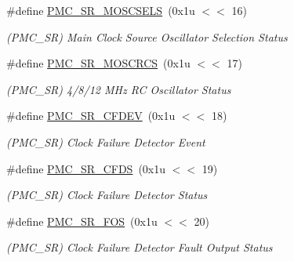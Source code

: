 \begin{DoxyCompactItemize}
\mbox{\label{group__SAMV71__PMC_gac975de9eb7b93e8ad0b11e7cd6241c4e}} 
\#define \mbox{\hyperlink{group__SAMV71__PMC_gac975de9eb7b93e8ad0b11e7cd6241c4e}{P\+M\+C\+\_\+\+S\+R\+\_\+\+M\+O\+S\+C\+S\+E\+LS}}~(0x1u $<$$<$ 16)
\begin{DoxyCompactList}\small\item\em (P\+M\+C\+\_\+\+SR) Main Clock Source Oscillator Selection Status \end{DoxyCompactList}\item 
\mbox{\label{group__SAMV71__PMC_gae3934311ed8c252aa3a4e4efe277988a}} 
\#define \mbox{\hyperlink{group__SAMV71__PMC_gae3934311ed8c252aa3a4e4efe277988a}{P\+M\+C\+\_\+\+S\+R\+\_\+\+M\+O\+S\+C\+R\+CS}}~(0x1u $<$$<$ 17)
\begin{DoxyCompactList}\small\item\em (P\+M\+C\+\_\+\+SR) 4/8/12 M\+Hz RC Oscillator Status \end{DoxyCompactList}\item 
\mbox{\label{group__SAMV71__PMC_ga3adcbc5d4ac14b059a8fa1bdc190b0b0}} 
\#define \mbox{\hyperlink{group__SAMV71__PMC_ga3adcbc5d4ac14b059a8fa1bdc190b0b0}{P\+M\+C\+\_\+\+S\+R\+\_\+\+C\+F\+D\+EV}}~(0x1u $<$$<$ 18)
\begin{DoxyCompactList}\small\item\em (P\+M\+C\+\_\+\+SR) Clock Failure Detector Event \end{DoxyCompactList}\item 
\mbox{\label{group__SAMV71__PMC_ga76baf0ac10e0387d96168f44b4580dff}} 
\#define \mbox{\hyperlink{group__SAMV71__PMC_ga76baf0ac10e0387d96168f44b4580dff}{P\+M\+C\+\_\+\+S\+R\+\_\+\+C\+F\+DS}}~(0x1u $<$$<$ 19)
\begin{DoxyCompactList}\small\item\em (P\+M\+C\+\_\+\+SR) Clock Failure Detector Status \end{DoxyCompactList}\item 
\mbox{\label{group__SAMV71__PMC_ga643598dc51cd165a73738e4de195df0e}} 
\#define \mbox{\hyperlink{group__SAMV71__PMC_ga643598dc51cd165a73738e4de195df0e}{P\+M\+C\+\_\+\+S\+R\+\_\+\+F\+OS}}~(0x1u $<$$<$ 20)
\begin{DoxyCompactList}\small\item\em (P\+M\+C\+\_\+\+SR) Clock Failure Detector Fault Output Status \end{DoxyCompactList}\item 
$$
\end{DoxyCompactItemize}
